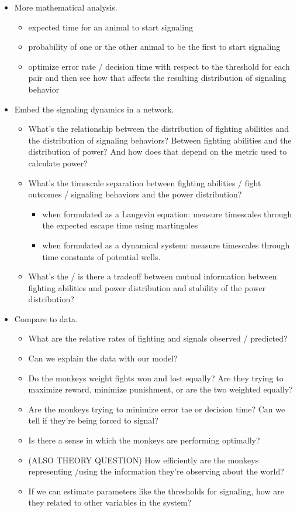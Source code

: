 \documentclass{article}
\begin{document}
\begin{itemize}
\item More mathematical analysis.
\begin{itemize}
\item expected time for an animal to start signaling
\item probability of one or the other animal to be the first to start signaling
\item optimize error rate / decision time with respect to the threshold for each pair and then see how that affects the resulting distribution of signaling behavior
\end{itemize}
\item Embed the signaling dynamics in a network.  
\begin{itemize}
\item What's the relationship between the distribution of fighting abilities and the distribution of signaling behaviors?  Between fighting abilities and the distribution of power?  And how does that depend on the metric used to calculate power?
\item What's the timescale separation between fighting abilities / fight outcomes / signaling behaviors and the power distribution?  
	\begin{itemize}
	\item when formulated as a Langevin equation: measure timescales through the expected escape time using martingales
	\item when formulated as a dynamical system: measure timescales through time constants of potential wells.
	\end{itemize}
\item What's the / is there a tradeoff between mutual information between fighting abilities and power distribution and stability of the power distribution?
\end{itemize}
\item Compare to data.
	\begin{itemize}
	\item What are the relative rates of fighting and signals observed / predicted?
	\item Can we explain the data with our model?
	\item Do the monkeys weight fights won and lost equally?  Are they trying to maximize reward, minimize punishment, or are the two weighted equally?
	\item Are the monkeys trying to minimize error tae or decision time? Can we tell if they're being forced to signal?
	\item Is there a sense in which the monkeys are performing optimally? 
	\item (ALSO THEORY QUESTION) How efficiently are the monkeys representing /using the information they're observing about the world?
	\item If we can estimate parameters like the thresholds for signaling, how are they related to other variables in the system?
	\end{itemize}
\end{itemize}



\nocite{*}


\end{document}
